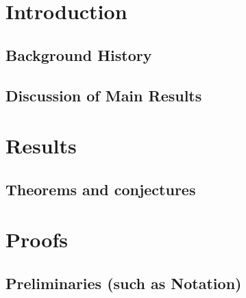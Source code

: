 \section{ Introduction}
\subsection{ Background History}
\subsection{ Discussion of Main Results}
\section{ Results}
\subsection{ Theorems and conjectures}
\section{ Proofs}
\subsection{ Preliminaries (such as Notation)}

